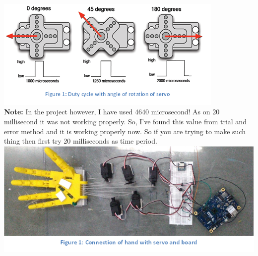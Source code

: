 \documentclass[11pt,a4paper]{article}
\newcommand\tab[1][1cm]{\hspace*{#1}}
\begin{document}
	\tab{For driving servo with Galileo board, we need to generate PWM signal. For that purpose, MRAA library has been put to use.}\\
	\vspace{.2cm}\\
	\tab{Here PWM signal’s time period should be 20 millisecond and duty cycle should be 1 to 2 milliseconds.}\\
	\vspace{1cm}
	\includegraphics[width=\linewidth]{2.png}
	\vspace{.3cm}\\
	\textbf{Note: }In the project however, I have used 4640 microsecond! As on 20 millisecond it was not working properly. So, I’ve found this value from trial and error method and it is working properly now. So if you are trying to make such thing then first try 20 milliseconds as time period.
	\newpage
	\vspace{.3cm}
	\includegraphics[width=\linewidth]{3.png}
	\vspace{.3cm}
\end{document}
